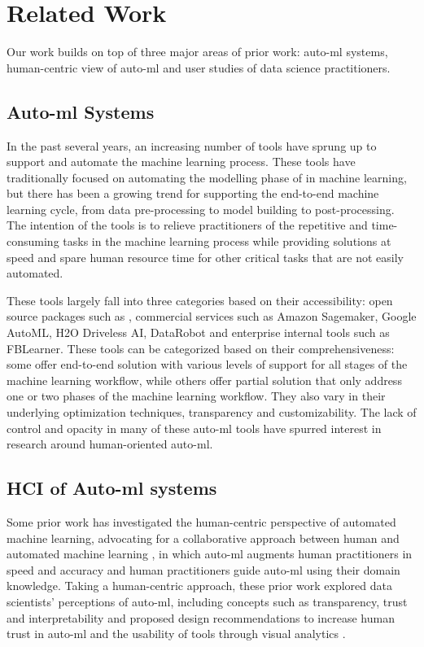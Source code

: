 \section{Related Work}
Our work builds on top of three major areas of prior work: auto-ml systems, human-centric view of auto-ml and user studies of data science practitioners. 

\subsection{Auto-ml Systems}
In the past several years, an increasing number of tools have sprung up to support and automate the machine learning process. These tools have traditionally focused on automating the modelling phase of in machine learning, but there has been a growing trend for supporting the end-to-end machine learning cycle, from data pre-processing to model building to post-processing. The intention of the tools is to relieve practitioners of the repetitive and time-consuming tasks in the machine learning process while providing solutions at speed and spare human resource time for other critical tasks that are not easily automated.



These tools largely fall into three categories based on their accessibility: open source packages such as \cite{Feurer:autosklearn,TPOT:Olson, auto-keras}, commercial services such as Amazon Sagemaker, Google AutoML, H2O Driveless AI, DataRobot and enterprise internal tools such as FBLearner. These tools can be categorized based on their comprehensiveness: some offer end-to-end solution with various levels of support for all stages of the machine learning workflow, while others offer partial solution that only address one or two phases of the machine learning workflow. They also vary in their underlying optimization techniques, transparency and customizability. The lack of control and opacity in many of these auto-ml tools have spurred interest in research around human-oriented auto-ml.

\subsection{HCI of Auto-ml systems}
Some prior work has investigated the human-centric perspective of automated machine learning, advocating for a collaborative approach between human and automated machine learning \cite{Lee2019AHP,wang2018atmseer, gilHGML}, in which auto-ml augments human practitioners in speed and accuracy and human practitioners guide auto-ml using their domain knowledge. Taking a human-centric approach, these prior work explored data scientists' perceptions of  auto-ml, including concepts such as transparency, trust and interpretability and proposed design recommendations to increase human trust in auto-ml and the usability of tools through visual analytics \cite{wang2018atmseer, cashman et al snowcast}.   

